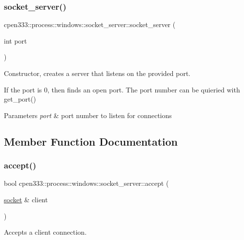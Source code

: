 \subsubsection{\texorpdfstring{socket\+\_\+server()}{socket\_server()}}
{\footnotesize\ttfamily cpen333\+::process\+::windows\+::socket\+\_\+server\+::socket\+\_\+server (\begin{DoxyParamCaption}\item[{int}]{port }\end{DoxyParamCaption})\hspace{0.3cm}{\ttfamily [inline]}}



Constructor, creates a server that listens on the provided port. 

If the port is 0, then finds an open port. The port number can be quieried with get\+\_\+port()


\begin{DoxyParams}{Parameters}
{\em port} & port number to listen for connections \\
\hline
\end{DoxyParams}


\subsection{Member Function Documentation}
\mbox{\label{classcpen333_1_1process_1_1windows_1_1socket__server_a9faaa8159f63116a3fa5e7a68ca8095a}} 
\subsubsection{\texorpdfstring{accept()}{accept()}}
{\footnotesize\ttfamily bool cpen333\+::process\+::windows\+::socket\+\_\+server\+::accept (\begin{DoxyParamCaption}\item[{\hyperlink{classcpen333_1_1process_1_1windows_1_1socket}{socket} \&}]{client }\end{DoxyParamCaption})\hspace{0.3cm}{\ttfamily [inline]}}



Accepts a client connection. 

